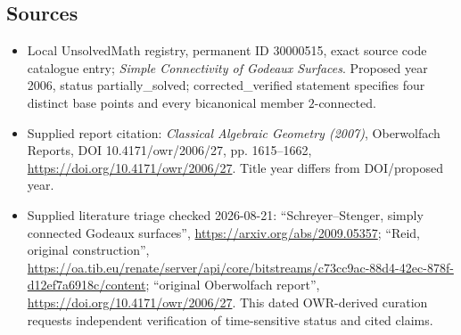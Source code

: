 \documentclass[11pt]{article}
\begin{document}
\subsection{Sources}
\begin{itemize}
\item Local UnsolvedMath registry, permanent ID 30000515, exact source code catalogue entry; \emph{Simple Connectivity of Godeaux Surfaces}. Proposed year 2006, status partially\_solved; corrected\_verified statement specifies four distinct base points and every bicanonical member $2$-connected.
\item Supplied report citation: \emph{Classical Algebraic Geometry (2007)}, Oberwolfach Reports, DOI 10.4171/owr/2006/27, pp. 1615--1662, \url{https://doi.org/10.4171/owr/2006/27}. Title year differs from DOI/proposed year.
\item Supplied literature triage checked 2026-08-21: ``Schreyer--Stenger, simply connected Godeaux surfaces'', \url{https://arxiv.org/abs/2009.05357}; ``Reid, original construction'', \url{https://oa.tib.eu/renate/server/api/core/bitstreams/c73cc9ac-88d4-42ec-878f-d12ef7a6918c/content}; ``original Oberwolfach report'', \url{https://doi.org/10.4171/owr/2006/27}. This dated OWR-derived curation requests independent verification of time-sensitive status and cited claims.
\end{itemize}
\end{document}
